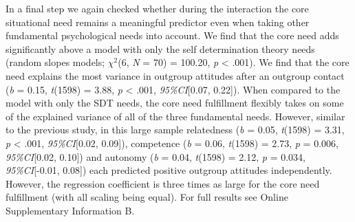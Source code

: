 In a final step we again checked whether during the interaction the core
situational need remains a meaningful predictor even when taking other
fundamental psychological needs into account. We find that the core need
adds significantly above a model with only the self determination theory
needs (random slopes models; \(\chi^2\)(6, \textit{N} = 70) = 100.20,
\textit{p} \textless{} .001). We find that the core need explains the
most variance in outgroup attitudes after an outgroup contact
(\textit{b} = 0.15, \textit{t}(1598) = 3.88, \textit{p} \textless{}
.001, \textit{95\%CI}{[}0.07, 0.22{]}). When compared to the model with
only the SDT needs, the core need fulfillment flexibly takes on some of
the explained variance of all of the three fundamental needs. However,
similar to the previous study, in this large sample relatedness
(\textit{b} = 0.05, \textit{t}(1598) = 3.31, \textit{p} \textless{}
.001, \textit{95\%CI}{[}0.02, 0.09{]}), competence (\textit{b} = 0.06,
\textit{t}(1598) = 2.73, \textit{p} = 0.006, \textit{95\%CI}{[}0.02,
0.10{]}) and autonomy (\textit{b} = 0.04, \textit{t}(1598) = 2.12,
\textit{p} = 0.034, \textit{95\%CI}{[}-0.01, 0.08{]}) each predicted
positive outgroup attitudes independently. However, the regression
coefficient is three times as large for the core need fulfillment (with
all scaling being equal). For full results see Online Supplementary
Information B.
